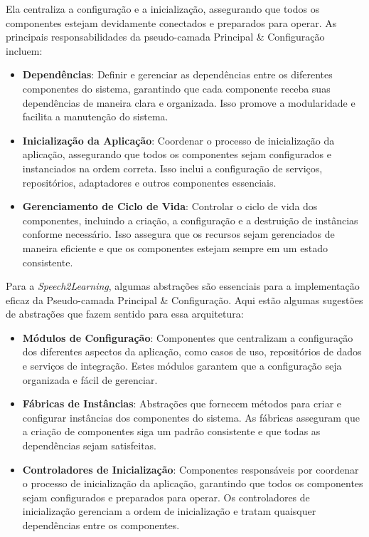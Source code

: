 Ela centraliza a configuração e a inicialização, assegurando que todos os componentes estejam devidamente conectados e preparados para operar. As principais responsabilidades da pseudo-camada Principal \& Configuração incluem:

\begin{itemize}
    \item \textbf{Dependências}: Definir e gerenciar as dependências entre os diferentes componentes do sistema, garantindo que cada componente receba suas dependências de maneira clara e organizada. Isso promove a modularidade e facilita a manutenção do sistema.

    \item \textbf{Inicialização da Aplicação}: Coordenar o processo de inicialização da aplicação, assegurando que todos os componentes sejam configurados e instanciados na ordem correta. Isso inclui a configuração de serviços, repositórios, adaptadores e outros componentes essenciais.

    \item \textbf{Gerenciamento de Ciclo de Vida}: Controlar o ciclo de vida dos componentes, incluindo a criação, a configuração e a destruição de instâncias conforme necessário. Isso assegura que os recursos sejam gerenciados de maneira eficiente e que os componentes estejam sempre em um estado consistente.
\end{itemize}

Para a \textit{Speech2Learning}, algumas abstrações são essenciais para a implementação eficaz da Pseudo-camada Principal \& Configuração. Aqui estão algumas sugestões de abstrações que fazem sentido para essa arquitetura:

\begin{itemize}
    \item \textbf{Módulos de Configuração}: Componentes que centralizam a configuração dos diferentes aspectos da aplicação, como casos de uso, repositórios de dados e serviços de integração. Estes módulos garantem que a configuração seja organizada e fácil de gerenciar.

    \item \textbf{Fábricas de Instâncias}: Abstrações que fornecem métodos para criar e configurar instâncias dos componentes do sistema. As fábricas asseguram que a criação de componentes siga um padrão consistente e que todas as dependências sejam satisfeitas.

    \item \textbf{Controladores de Inicialização}: Componentes responsáveis por coordenar o processo de inicialização da aplicação, garantindo que todos os componentes sejam configurados e preparados para operar. Os controladores de inicialização gerenciam a ordem de inicialização e tratam quaisquer dependências entre os componentes.
\end{itemize}

